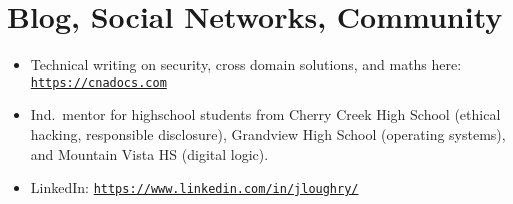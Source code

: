 \section*{Blog, Social Networks, Community}
\vspace{-3mm}

\begin{itemize}
    \item Technical writing on security, cross domain solutions, and maths
        here:
        \href{https://cnadocs.com}{\nolinkurl{https://cnadocs.com}}\vspace{-1mm}
    \item Ind.\ mentor for highschool students from Cherry Creek High School
        (ethical hacking, responsible disclosure), Grandview High School
        (operating systems), and Mountain Vista HS (digital logic).\vspace{-1mm}
    \item LinkedIn:
        \href{https://www.linkedin.com/in/jloughry/}{\nolinkurl{https://www.linkedin.com/in/jloughry/}}
\end{itemize}

